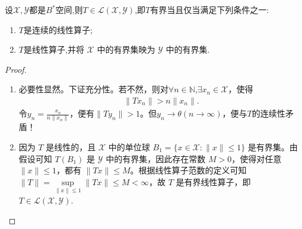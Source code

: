 \documentclass[../../main.tex]{subfiles}%
\begin{document}
\begin{proposition}\label{proposition:线性算子有界当且仅当连续}
设$\mathscr{X},\mathscr{Y}$都是$B^*$空间,则$T\in \mathscr{L}(\mathscr{X},\mathscr{Y})$,即$T$有界当且仅当满足下列条件之一:
\begin{enumerate}[(1)]
\item $T$是连续的线性算子;

\item $T$是线性算子,并将 $\mathscr{X}$ 中的有界集映为 $\mathscr{Y}$ 中的有界集.
\end{enumerate}
\end{proposition}
\begin{proof}
\begin{enumerate}[(1)]
\item 必要性显然。下证充分性。若不然，则对$\forall n\in \mathbb{N}$,$\exists x_n\in\mathscr{X}$，使得
\begin{align*}
\|Tx_n\|>n\|x_n\|.
\end{align*}
令$y_n=\frac{x_n}{n\|x_n\|}$，便有$\|Ty_n\|>1$。但$y_n\to\theta(n\to\infty)$，便与$T$的连续性矛盾！

\item 因为 $T$ 是线性的，且 $\mathscr{X}$ 中的单位球 $B_1 = \{x \in \mathscr{X} : \|x\| \leqslant 1\}$ 是有界集。由假设可知 $T(B_1)$ 是 $\mathscr{Y}$ 中的有界集，因此存在常数 $M > 0$，使得对任意 $\|x\| \leqslant 1$，都有 $\|Tx\| \leqslant M$。根据线性算子范数的定义可知 $\|T\| = \sup\limits_{\|x\| \leqslant 1} \|Tx\| \leqslant M < \infty$，故 $T$ 是有界线性算子，即 $T \in \mathscr{L}(\mathscr{X},\mathscr{Y})$.
\end{enumerate}
\end{proof}
\end{document}
